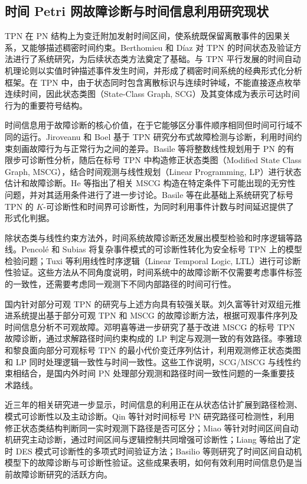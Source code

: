 \documentclass[master,fontset=ubuntu]{shnuthesis}
\theoremstyle{definition}
\begin{document}
\subsection{时间 Petri 网故障诊断与时间信息利用研究现状}

TPN 在 PN 结构上为变迁附加发射时间区间，使系统既保留离散事件的因果关系，又能够描述稠密时间约束。Berthomieu 和 D\'iaz 对 TPN 的时间状态及验证方法进行了系统研究，为后续状态类方法奠定了基础\cite{Berthomieu1991}。与 TPN 平行发展的时间自动机理论则以实值时钟描述事件发生时间，并形成了稠密时间系统的经典形式化分析框架\cite{Alur1994}。在 TPN 中，由于状态同时包含离散标识与连续时钟域，不能直接逐点枚举连续时间，因此状态类图（State-Class Graph, SCG）及其变体成为表示可达时间行为的重要符号结构。

时间信息用于故障诊断的核心价值，在于它能够区分事件顺序相同但时间可行域不同的运行。Jiroveanu 和 Boel 基于 TPN 研究分布式故障检测与诊断，利用时间约束刻画故障行为与正常行为之间的差异\cite{Jiroveanu2006}。Basile 等将整数线性规划用于 PN 的有限步可诊断性分析\cite{Basile2012}，随后在标号 TPN 中构造修正状态类图（Modified State Class Graph, MSCG），结合时间观测与线性规划（Linear Programming, LP）进行状态估计和故障诊断\cite{Basile2015}。He 等指出了相关 MSCG 构造在特定条件下可能出现的无穷性问题，并对其适用条件进行了进一步讨论\cite{He2019}。Basile 等在此基础上系统研究了标号 TPN 的 $K$-可诊断性和时间界可诊断性，为同时利用事件计数与时间延迟提供了形式化判据\cite{Basile2017}。

除状态类与线性约束方法外，时间系统故障诊断还发展出模型检验和时序逻辑等路线。Pencol\'e 和 Subias 将复杂事件模式的可诊断性转化为安全标号 TPN 上的模型检验问题\cite{Pencole2022}；Tuxi 等利用线性时序逻辑（Linear Temporal Logic, LTL）进行可诊断性验证\cite{Tuxi2022}。这些方法从不同角度说明，时间系统中的故障诊断不仅需要考虑事件标签的一致性，还需要考虑同一观测下不同内部路径的时间可行性。

国内针对部分可观 TPN 的研究与上述方向具有较强关联。刘久富等针对双组元推进系统提出基于部分可观 TPN 和 MSCG 的故障诊断方法，根据可观事件序列及时间信息分析不可观故障\cite{Liu2018}。邓明喜等进一步研究了基于改进 MSCG 的标号 TPN 故障诊断，通过求解路径时间约束构成的 LP 判定与观测一致的有效路径\cite{Deng2022}。李雅琼和黎良面向部分可观标号 TPN 的最小代价变迁序列估计，利用观测修正状态类图和 LP 同时处理逻辑一致性与时间一致性\cite{LiYaqiong2024}。这些工作说明，SCG/MSCG 与线性约束相结合，是国内外时间 PN 处理部分观测和路径时间一致性问题的一条重要技术路线。

近三年的相关研究进一步显示，时间信息的利用正在从状态估计扩展到路径检测、模式可诊断性以及主动诊断。Qin 等针对时间标号 PN 研究路径可检测性，利用修正状态类结构判断同一实时观测下路径是否可区分\cite{Qin2025}；Miao 等针对时间区间自动机研究主动诊断，通过时间区间与逻辑控制共同增强可诊断性\cite{Miao2025}；Liang 等给出了定时 DES 模式可诊断性的多项式时间验证方法\cite{Liang2025}；Basilio 等则研究了时间区间自动机模型下的故障诊断与可诊断性验证\cite{Basilio2025}。这些成果表明，如何有效利用时间信息仍是当前故障诊断研究的活跃方向。
\end{document}
